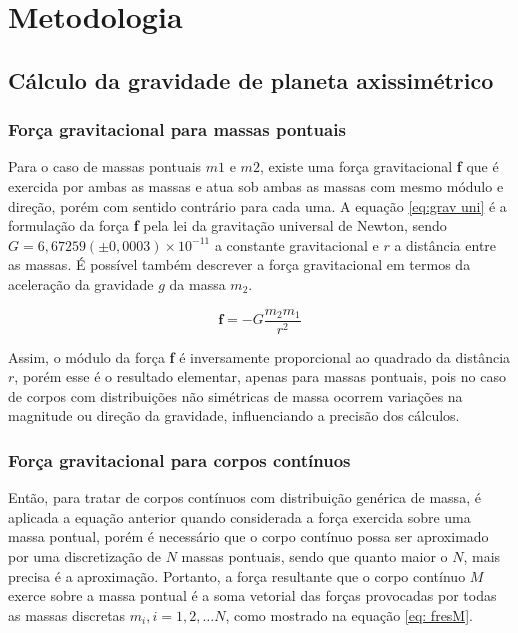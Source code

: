 \chapter{Metodologia}

\section{Cálculo da gravidade de planeta axissimétrico}
\subsection{Força gravitacional para massas pontuais}

Para o caso de massas pontuais $m1$ e $m2$, existe uma força gravitacional \textbf{f} que é exercida por ambas as massas e atua sob ambas as massas com mesmo módulo e direção, porém com sentido contrário para cada uma. A equação \ref{eq:grav uni} é a formulação da força \textbf{f} pela lei da gravitação universal de Newton, sendo $G = 6,67259(\pm 0,0003) \times 10^{-11}$ a constante gravitacional e $r$ a distância entre as massas. É possível também descrever a força gravitacional em termos da aceleração da gravidade $g$ da massa $m_{2}$.

\begin{equation}
\textbf{f} = -G\frac{m_{2}m_{1}}{r^{2}} 
\label{eq:grav uni}
\end{equation}

Assim, o módulo da força \textbf{f} é inversamente proporcional ao quadrado da distância $r$, porém esse é o resultado elementar, apenas para massas pontuais, pois no caso de corpos com distribuições não simétricas de massa ocorrem variações na magnitude ou direção da gravidade, influenciando a precisão dos cálculos. 

\subsection{Força gravitacional para corpos contínuos}
Então, para tratar de corpos contínuos com distribuição genérica de massa, é aplicada a equação anterior quando considerada a força exercida sobre uma massa pontual, porém é necessário que o corpo contínuo possa ser aproximado por uma discretização de $N$ massas pontuais, sendo que quanto maior o $N$, mais precisa é a aproximação. Portanto, a força resultante que o corpo contínuo $M$ exerce sobre a massa pontual é a soma vetorial das forças provocadas por todas as massas discretas $m_{i}, i = 1, 2, \dots N$, como mostrado na equação \ref{eq: fresM}. 

